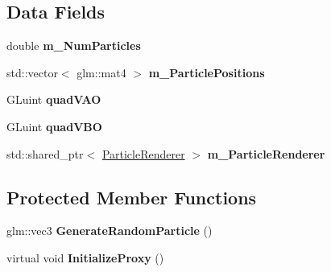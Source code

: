 \subsection*{Data Fields}
\begin{DoxyCompactItemize}
\item 
double {\bfseries m\+\_\+\+Num\+Particles}\hypertarget{class_particle_proxy_ac1003f27c030a6500f474f6166dace1f}{}\label{class_particle_proxy_ac1003f27c030a6500f474f6166dace1f}

\item 
std\+::vector$<$ glm\+::mat4 $>$ {\bfseries m\+\_\+\+Particle\+Positions}\hypertarget{class_particle_proxy_a23bcc9dfa75f02d16d71d37a6589d365}{}\label{class_particle_proxy_a23bcc9dfa75f02d16d71d37a6589d365}

\item 
G\+Luint {\bfseries quad\+V\+AO}\hypertarget{class_particle_proxy_a863b18298ede87d5429c161bcfa4e1aa}{}\label{class_particle_proxy_a863b18298ede87d5429c161bcfa4e1aa}

\item 
G\+Luint {\bfseries quad\+V\+BO}\hypertarget{class_particle_proxy_a430ac2d3094c4f9e06d9c09d819f1dd8}{}\label{class_particle_proxy_a430ac2d3094c4f9e06d9c09d819f1dd8}

\item 
std\+::shared\+\_\+ptr$<$ \hyperlink{class_particle_renderer}{Particle\+Renderer} $>$ {\bfseries m\+\_\+\+Particle\+Renderer}\hypertarget{class_particle_proxy_ab71eb6a1258fbc85bf83a74ba1049f19}{}\label{class_particle_proxy_ab71eb6a1258fbc85bf83a74ba1049f19}

\end{DoxyCompactItemize}
\subsection*{Protected Member Functions}
\begin{DoxyCompactItemize}
\item 
glm\+::vec3 {\bfseries Generate\+Random\+Particle} ()\hypertarget{class_particle_proxy_a92f6d1b4151d3d1c11c67b9dfb3fcf98}{}\label{class_particle_proxy_a92f6d1b4151d3d1c11c67b9dfb3fcf98}

\item 
virtual void {\bfseries Initialize\+Proxy} ()\hypertarget{class_particle_proxy_ae46bb012de9ebccb924ea1fc13696430}{}\label{class_particle_proxy_ae46bb012de9ebccb924ea1fc13696430}

\end{DoxyCompactItemize}
